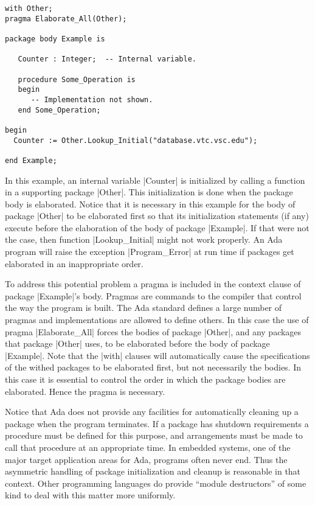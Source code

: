 \begin{lstlisting}
with Other;
pragma Elaborate_All(Other);

package body Example is

   Counter : Integer;  -- Internal variable.

   procedure Some_Operation is
   begin
      -- Implementation not shown.
   end Some_Operation;

begin
  Counter := Other.Lookup_Initial("database.vtc.vsc.edu");

end Example;
\end{lstlisting}


In this example, an internal variable |Counter| is initialized by calling a function in a
supporting package |Other|. This initialization is done when the package body is elaborated.
Notice that it is necessary in this example for the body of package |Other| to be elaborated
first so that its initialization statements (if any) execute before the elaboration of the body
of package |Example|. If that were not the case, then function |Lookup_Initial| might not work
properly. An Ada program will raise the exception |Program_Error| at run time if packages get
elaborated in an inappropriate order.

To address this potential problem a pragma is included in the context clause of package
|Example|'s body. Pragmas are commands to the compiler that control the way the program is
built. The Ada standard defines a large number of pragmas and implementations are allowed to
define others. In this case the use of pragma |Elaborate_All| forces the bodies of package
|Other|, and any packages that package |Other| uses, to be elaborated before the body of package
|Example|. Note that the |with| clauses will automatically cause the specifications of the
withed packages to be elaborated first, but not necessarily the bodies. In this case it is
essential to control the order in which the package bodies are elaborated. Hence the pragma is
necessary.

Notice that Ada does not provide any facilities for automatically cleaning up a package when the
program terminates. If a package has shutdown requirements a procedure must be defined for this
purpose, and arrangements must be made to call that procedure at an appropriate time. In
embedded systems, one of the major target application areas for Ada, programs often never end.
Thus the asymmetric handling of package initialization and cleanup is reasonable in that
context. Other programming languages do provide ``module destructors'' of some kind to deal with
this matter more uniformly.

